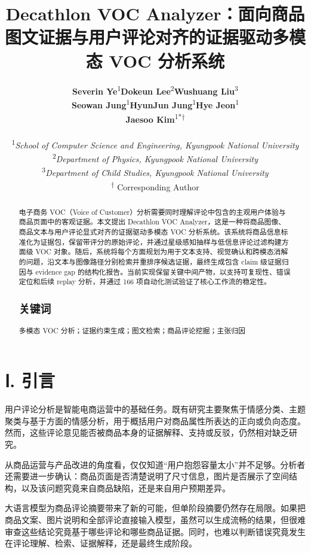 \documentclass[11pt]{article}
\title{\textbf{Decathlon VOC Analyzer：面向商品图文证据与用户评论对齐的证据驱动多模态 VOC 分析系统}}
\author{{\small
\begin{tabular}{@{}ccc@{}}
\parbox[t]{0.3067\textwidth}{\centering \textbf{Severin Ye}\textsuperscript{1}} & \parbox[t]{0.3067\textwidth}{\centering \textbf{Dokeun Lee}\textsuperscript{2}} & \parbox[t]{0.3067\textwidth}{\centering \textbf{Wushuang Liu}\textsuperscript{3}} \\[0.9em]
\parbox[t]{0.3067\textwidth}{\centering \textbf{Seowan Jung}\textsuperscript{1}} & \parbox[t]{0.3067\textwidth}{\centering \textbf{HyunJun Jung}\textsuperscript{1}} & \parbox[t]{0.3067\textwidth}{\centering \textbf{Hye Jeon}\textsuperscript{1}} \\[0.9em]
\parbox[t]{0.3067\textwidth}{} & \parbox[t]{0.3067\textwidth}{\centering \textbf{Jaesoo Kim}\textsuperscript{1*†}} & \parbox[t]{0.3067\textwidth}{} \\
\multicolumn{3}{c}{} \\[0.45em]
\multicolumn{3}{c}{\parbox{0.9200\textwidth}{\centering\small\textsuperscript{1}\textit{School of Computer Science and Engineering, Kyungpook National University}}} \\
\multicolumn{3}{c}{\parbox{0.9200\textwidth}{\centering\small\textsuperscript{2}\textit{Department of Physics, Kyungpook National University}}} \\
\multicolumn{3}{c}{\parbox{0.9200\textwidth}{\centering\small\textsuperscript{3}\textit{Department of Child Studies, Kyungpook National University}}} \\
\multicolumn{3}{c}{\small \textsuperscript{†}  Corresponding Author} \\
\end{tabular}
}}
\date{} %
\begin{document}
\maketitle
\nocite{lewis2020retrievalAugmentedGeneration,gao2023rarr,radford2021clip,liu2024structuredOutputBenchmark,geng2023grammarConstrainedDecoding,yao2023react,nvidia2024multimodalRagIntro,nvidia2024aiReadyKnowledgeSystems,faysse2024colpali,pontiki2014semevalAspect,qdrant2024pdfRetrievalAtScale,qdrant2024multiVectorCourse,manning2008introductionIr}

\begin{abstract}
电子商务 VOC（Voice of Customer）分析需要同时理解评论中包含的主观用户体验与商品页面中的客观证据。本文提出 Decathlon VOC Analyzer，这是一种将商品图像、商品文本与用户评论显式对齐的证据驱动多模态 VOC 分析系统。该系统将商品信息标准化为证据包，保留带评分的原始评论，并通过星级感知抽样与低信息评论过滤构建方面级 VOC 对象。随后，系统将每个方面规划为用于文本支持、视觉确认和跨模态消解的问题，沿文本与图像路径分别检索并重排序候选证据，最终生成包含 claim 级证据归因与 evidence gap 的结构化报告。当前实现保留关键中间产物，以支持可复现性、错误定位和后续 replay 分析，并通过 166 项自动化测试验证了核心工作流的稳定性。

\subsection{关键词}

多模态 VOC 分析；证据约束生成；图文检索；商品评论挖掘；主张归因
\end{abstract}

\section{Ⅰ. 引言}
用户评论分析是智能电商运营中的基础任务。既有研究主要聚焦于情感分类、主题聚类与基于方面的情感分析，用于概括用户对商品属性所表达的正向或负向态度。然而，这些评论意见能否被商品本身的证据解释、支持或反驳，仍然相对缺乏研究。

从商品运营与产品改进的角度看，仅仅知道``用户抱怨容量太小''并不足够。分析者还需要进一步确认：商品页面是否清楚说明了尺寸信息，图片是否展示了空间结构，以及该问题究竟来自商品缺陷，还是来自用户预期差异。

大语言模型为商品评论摘要带来了新的可能，但单阶段摘要仍然存在局限。如果把商品文案、图片说明和全部评论直接输入模型，虽然可以生成流畅的结果，但很难审查这些结论究竟基于哪些评论和哪些商品证据。同时，也难以判断错误究竟发生在评论理解、检索、证据解释，还是最终生成阶段。
\end{document}
